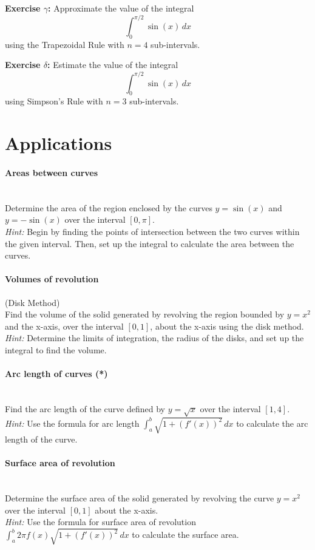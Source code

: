 \documentclass[]{article}
\begin{document}
	\textbf{Exercise $\gamma$:}
	Approximate the value of the integral
	\[
	\int_0^{\pi/2} \sin(x) \, dx
	\]
	using the Trapezoidal Rule with \(n = 4\) sub-intervals.
	
	\textbf{Exercise $\delta$:}
	Estimate the value of the integral
	\[
	\int_0^{\pi/2} \sin(x) \, dx
	\]
	using Simpson's Rule with \(n = 3\) sub-intervals.
	
	
	\section{Applications}
	\paragraph{Areas between curves}\mbox{}\\
	Determine the area of the region enclosed by the curves \(y = \sin(x)\) and \(y = -\sin(x)\) over the interval \([0, \pi]\).\\
	\textit{Hint:} Begin by finding the points of intersection between the two curves within the given interval.
	Then, set up the integral to calculate the area between the curves.
	
	\paragraph{Volumes of revolution} (Disk Method)\\
	Find the volume of the solid generated by revolving the region bounded by \(y = x^2\) and the x-axis, over the interval \([0, 1]\), about the x-axis using the disk method.\\
	\textit{Hint:} Determine the limits of integration, the radius of the disks, and set up the integral to find the volume.
	
	\paragraph{Arc length of curves (*)}\mbox{}\\
	Find the arc length of the curve defined by \(y = \sqrt{x}\) over the interval \([1, 4]\).\\
	\textit{Hint:} Use the formula for arc length \(\int_a^b \sqrt{1 + (f'(x))^2} \, dx\) to calculate the arc length of the curve.
	
	\paragraph{Surface area of revolution}\mbox{}\\
	Determine the surface area of the solid generated by revolving the curve \(y = x^2\) over the interval \([0, 1]\) about the x-axis.\\
	\textit{Hint:} Use the formula for surface area of revolution \(\int_a^b 2\pi f(x) \sqrt{1 + (f'(x))^2} \, dx\) to calculate the surface area.
	
\end{document}
